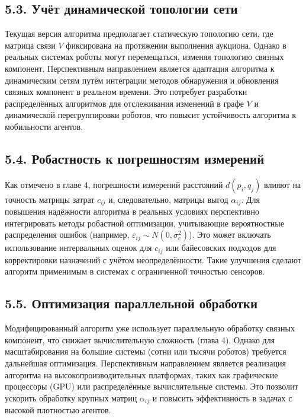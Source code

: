 \subsection*{5.3. Учёт динамической топологии сети}
Текущая версия алгоритма предполагает статическую топологию сети, где матрица связи $V$ фиксирована на протяжении выполнения аукциона. Однако в реальных системах роботы могут перемещаться, изменяя топологию связных компонент. Перспективным направлением является адаптация алгоритма к динамическим сетям путём интеграции методов обнаружения и обновления связных компонент в реальном времени. Это потребует разработки распределённых алгоритмов для отслеживания изменений в графе $V$ и динамической перегруппировки роботов, что повысит устойчивость алгоритма к мобильности агентов.

\subsection*{5.4. Робастность к погрешностям измерений}
Как отмечено в главе 4, погрешности измерений расстояний $d(p_i, q_j)$ влияют на точность матрицы затрат $c_{ij}$ и, следовательно, матрицы выгод $\alpha_{ij}$. Для повышения надёжности алгоритма в реальных условиях перспективно интегрировать методы робастной оптимизации, учитывающие вероятностные распределения ошибок (например, $\varepsilon_{ij} \sim N(0, \sigma_c^2)$). Это может включать использование интервальных оценок для $c_{ij}$ или байесовских подходов для корректировки назначений с учётом неопределённости. Такие улучшения сделают алгоритм применимым в системах с ограниченной точностью сенсоров.

\subsection*{5.5. Оптимизация параллельной обработки}
Модифицированный алгоритм уже использует параллельную обработку связных компонент, что снижает вычислительную сложность (глава 4). Однако для масштабирования на большие системы (сотни или тысячи роботов) требуется дальнейшая оптимизация. Перспективным направлением является реализация алгоритма на высокопроизводительных платформах, таких как графические процессоры (GPU) или распределённые вычислительные системы. Это позволит ускорить обработку крупных матриц $\alpha_{ij}$ и повысить эффективность в задачах с высокой плотностью агентов.

